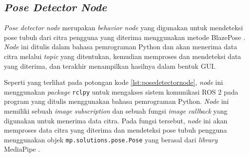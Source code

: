 \subsection{\emph{Pose Detector Node}}
\label{subsec:posedetectornode}

\emph{Pose detector node} merupakan \emph{behavior node} yang digunakan untuk mendeteksi pose tubuh dari citra pengguna yang diterima menggunakan metode BlazePose \citep{cit:bazarevsky2020}.
\emph{Node} ini ditulis dalam bahasa pemrograman Python dan akan menerima data citra melalui \emph{topic} yang ditentukan,
  kemudian memproses dan mendeteksi data yang diterima,
  dan terakhir menampilkan hasilnya dalam bentuk GUI.



Seperti yang terlihat pada potongan kode \ref{lst:posedetectornode},
  \emph{node} ini menggunakan \emph{package} \lstinline{rclpy} untuk mengakses sistem komunikasi ROS 2 pada program yang ditulis menggunakan bahasa pemrograman Python.
\emph{Node} ini memiliki sebuah \emph{image subscription} dan sebuah fungsi \emph{image callback} yang digunakan untuk menerima data citra.
Pada fungsi tersebut, \emph{node} ini akan memproses data citra yang diterima dan mendeteksi pose tubuh pengguna menggunakan objek \lstinline{mp.solutions.pose.Pose} yang berasal dari \emph{library} MediaPipe \citep{cit:lugaresi2019}.
